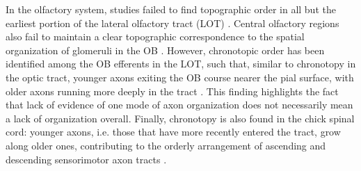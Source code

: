 \label{sec:LOT}
In the olfactory system, studies failed to find topographic order in all but the earliest portion of the lateral olfactory tract (LOT) \cite{price1975observation}.
Central olfactory regions also fail to maintain a clear topographic correspondence to the spatial organization of glomeruli in the OB \cite{luskin1982distribution,sosulski2011distinct}.
However, chronotopic order has been identified among the OB efferents in the LOT, such that, similar to chronotopy in the optic tract, younger axons exiting the OB course nearer the pial surface, with older axons running more deeply in the tract \cite{yamatani2004chronotopic}. 
This finding highlights the fact that lack of evidence of one mode of axon organization does not necessarily mean a lack of organization overall.
Finally, chronotopy is also found in the chick spinal cord: younger axons, i.e. those that have more recently entered the tract, grow along older ones, contributing to the orderly arrangement of ascending and descending sensorimotor axon tracts \cite{nornes1980pattern}.